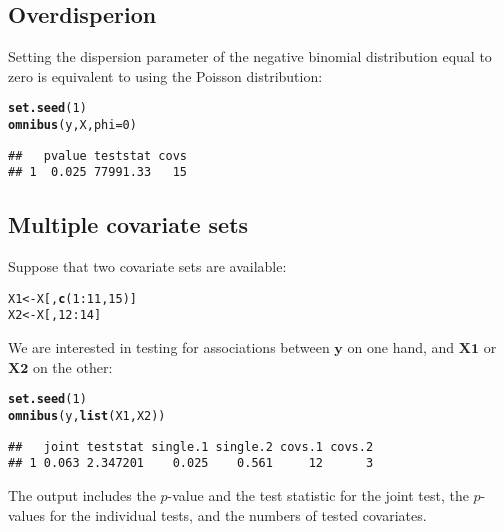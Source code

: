 \documentclass{article}\usepackage[]{graphicx}\usepackage[]{color}
\makeatletter
\newcommand{\hlnum}[1]{\textcolor[rgb]{0.686,0.059,0.569}{#1}}%
\newcommand{\hlopt}[1]{\textcolor[rgb]{0,0,0}{#1}}%
\newcommand{\hlstd}[1]{\textcolor[rgb]{0.345,0.345,0.345}{#1}}%
\newcommand{\hlkwb}[1]{\textcolor[rgb]{0.69,0.353,0.396}{#1}}%
\newcommand{\hlkwc}[1]{\textcolor[rgb]{0.333,0.667,0.333}{#1}}%
\newcommand{\hlkwd}[1]{\textcolor[rgb]{0.737,0.353,0.396}{\textbf{#1}}}%
\newenvironment{kframe}{%
 \def\at@end@of@kframe{}%
 \ifinner\ifhmode%
  \def\at@end@of@kframe{\end{minipage}}%
  \begin{minipage}{\columnwidth}%
 \fi\fi%
 \def\FrameCommand##1{\hskip\@totalleftmargin \hskip-\fboxsep
 \colorbox{shadecolor}{##1}\hskip-\fboxsep
     \hskip-\linewidth \hskip-\@totalleftmargin \hskip\columnwidth}%
 \MakeFramed {\advance\hsize-\width
   \@totalleftmargin\z@ \linewidth\hsize
   \@setminipage}}%
 {\par\unskip\endMakeFramed%
 \at@end@of@kframe}
\newenvironment{knitrout}{}{} %
\makeatother
\begin{document}
\newpage

\subsection{Overdisperion}
\label{TOA Overdispersion}

Setting the dispersion parameter of the negative binomial distribution equal to zero is equivalent to using the Poisson distribution:
\begin{knitrout}
\color{fgcolor}\begin{kframe}
\begin{alltt}
\hlkwd{set.seed}\hlstd{(}\hlnum{1}\hlstd{)}
\hlkwd{omnibus}\hlstd{(y,X,}\hlkwc{phi}\hlstd{=}\hlnum{0}\hlstd{)}
\end{alltt}
\begin{verbatim}
##   pvalue teststat covs
## 1  0.025 77991.33   15
\end{verbatim}
\end{kframe}
\end{knitrout}

\subsection{Multiple covariate sets}
\label{TOA Multiple covariate sets}

Suppose that two covariate sets are available:
\begin{knitrout}
\color{fgcolor}\begin{kframe}
\begin{alltt}
\hlstd{X1} \hlkwb{<-} \hlstd{X[,}\hlkwd{c}\hlstd{(}\hlnum{1}\hlopt{:}\hlnum{11}\hlstd{,}\hlnum{15}\hlstd{)]}
\hlstd{X2} \hlkwb{<-} \hlstd{X[,}\hlnum{12}\hlopt{:}\hlnum{14}\hlstd{]}
\end{alltt}
\end{kframe}
\end{knitrout}

We are interested in testing for associations between $\boldsymbol{y}$ on one hand, and $\boldsymbol{X1}$ or $\boldsymbol{X2}$ on the other:
\begin{knitrout}
\color{fgcolor}\begin{kframe}
\begin{alltt}
\hlkwd{set.seed}\hlstd{(}\hlnum{1}\hlstd{)}
\hlkwd{omnibus}\hlstd{(y,}\hlkwd{list}\hlstd{(X1,X2))}
\end{alltt}
\begin{verbatim}
##   joint teststat single.1 single.2 covs.1 covs.2
## 1 0.063 2.347201    0.025    0.561     12      3
\end{verbatim}
\end{kframe}
\end{knitrout}
The output includes the \mbox{$p$-value} and the test statistic for the joint test, the \mbox{$p$-values} for the individual tests, and the numbers of tested covariates.
\end{document}
